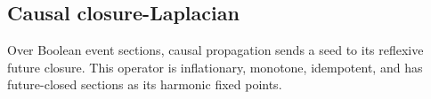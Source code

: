 \subsection{Causal closure-Laplacian}

\begin{theorem}\label{thm:causal-laplacian}\leanok{}
Over Boolean event sections, causal propagation sends a seed to its reflexive
future closure. This operator is inflationary, monotone, idempotent, and has
future-closed sections as its harmonic fixed points.
\end{theorem}
